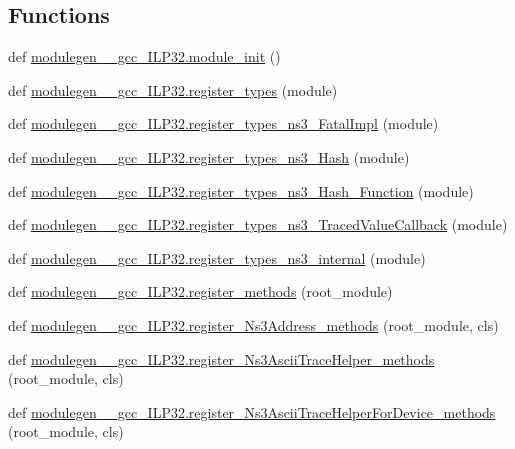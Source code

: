 \subsection*{Functions}
\begin{DoxyCompactItemize}
\item 
def \hyperlink{namespacemodulegen____gcc__ILP32_adeca9ed3c99593bd5eb3b0bd7981c321}{modulegen\+\_\+\+\_\+gcc\+\_\+\+I\+L\+P32.\+module\+\_\+init} ()
\item 
def \hyperlink{namespacemodulegen____gcc__ILP32_af565b2741bb1cd768d289459114389b9}{modulegen\+\_\+\+\_\+gcc\+\_\+\+I\+L\+P32.\+register\+\_\+types} (module)
\item 
def \hyperlink{namespacemodulegen____gcc__ILP32_aab873702fb2d41d9a78db27492ae87a5}{modulegen\+\_\+\+\_\+gcc\+\_\+\+I\+L\+P32.\+register\+\_\+types\+\_\+ns3\+\_\+\+Fatal\+Impl} (module)
\item 
def \hyperlink{namespacemodulegen____gcc__ILP32_a0bce51bcadf44c501181b3a56b927a40}{modulegen\+\_\+\+\_\+gcc\+\_\+\+I\+L\+P32.\+register\+\_\+types\+\_\+ns3\+\_\+\+Hash} (module)
\item 
def \hyperlink{namespacemodulegen____gcc__ILP32_af8a17079f3fe7bb312bb8a09266937fa}{modulegen\+\_\+\+\_\+gcc\+\_\+\+I\+L\+P32.\+register\+\_\+types\+\_\+ns3\+\_\+\+Hash\+\_\+\+Function} (module)
\item 
def \hyperlink{namespacemodulegen____gcc__ILP32_a1410eba4e1bf09d877cd7bd0ae8e66ef}{modulegen\+\_\+\+\_\+gcc\+\_\+\+I\+L\+P32.\+register\+\_\+types\+\_\+ns3\+\_\+\+Traced\+Value\+Callback} (module)
\item 
def \hyperlink{namespacemodulegen____gcc__ILP32_abcdfa1e2ddcdfff645f539fa053df219}{modulegen\+\_\+\+\_\+gcc\+\_\+\+I\+L\+P32.\+register\+\_\+types\+\_\+ns3\+\_\+internal} (module)
\item 
def \hyperlink{namespacemodulegen____gcc__ILP32_a94ccb7f04a4251f5353b68c8c69cb5fa}{modulegen\+\_\+\+\_\+gcc\+\_\+\+I\+L\+P32.\+register\+\_\+methods} (root\+\_\+module)
\item 
def \hyperlink{namespacemodulegen____gcc__ILP32_afc9e83375dc30250cd5d7973f09379a5}{modulegen\+\_\+\+\_\+gcc\+\_\+\+I\+L\+P32.\+register\+\_\+\+Ns3\+Address\+\_\+methods} (root\+\_\+module, cls)
\item 
def \hyperlink{namespacemodulegen____gcc__ILP32_aacf90cbd3fb384363506494c3c26b063}{modulegen\+\_\+\+\_\+gcc\+\_\+\+I\+L\+P32.\+register\+\_\+\+Ns3\+Ascii\+Trace\+Helper\+\_\+methods} (root\+\_\+module, cls)
\item 
def \hyperlink{namespacemodulegen____gcc__ILP32_a7eacac7fc36be83fed44c2980e7456e6}{modulegen\+\_\+\+\_\+gcc\+\_\+\+I\+L\+P32.\+register\+\_\+\+Ns3\+Ascii\+Trace\+Helper\+For\+Device\+\_\+methods} (root\+\_\+module, cls)

\end{DoxyCompactItemize}
